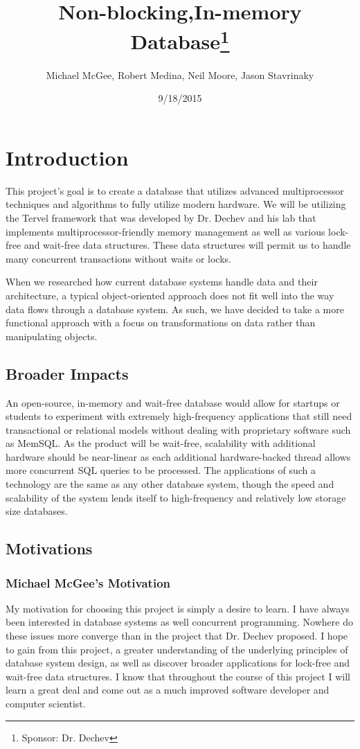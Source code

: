 \documentclass[letterpaper]{article}
\title{Non-blocking,In-memory Database\thanks{Sponsor: Dr. Dechev}}
\author{Michael McGee, Robert Medina, Neil Moore, Jason Stavrinaky}
\date{9/18/2015}
\begin{document}
  \maketitle
  \newpage

  \section{Introduction}
  This project's goal is to create a database that utilizes advanced multiprocessor techniques and algorithms to fully utilize modern hardware.
  We will be utilizing the Tervel framework that was developed by Dr. Dechev and his lab that implements multiprocessor-friendly memory management
  as well as various lock-free and wait-free data structures. These data structures will permit us to handle many concurrent transactions without 
  waits or locks.
  
  When we researched how current database systems handle data and their architecture, a typical object-oriented approach does not fit well into the 
  way data flows through a database system. As such, we have decided to take a more functional approach with a focus on transformations on data rather
  than manipulating objects.
  
  \subsection{Broader Impacts}
  An open-source, in-memory and wait-free database would allow for startups or students to experiment with extremely high-frequency applications that
  still need transactional or relational models without dealing with proprietary software such as MemSQL. As the product will be wait-free, scalability 
  with additional hardware should be near-linear as each additional hardware-backed thread allows more concurrent SQL queries to be processed. The 
  applications of such a technology are the same as any other database system, though the speed and scalability of the system lends itself to high-frequency
  and relatively low storage size databases.
  
  \subsection{Motivations}
  \subsubsection{Michael McGee's Motivation}
  My motivation for choosing this project is simply a desire to learn. I have always been interested in database systems as well concurrent programming. Nowhere do these issues more converge than in the project that Dr. Dechev proposed.  
  I hope to gain from this project, a greater understanding of the underlying principles of database system design, as well as discover broader applications for lock-free and wait-free data structures. I know that throughout the course of this project I will learn a great deal and come out as a much improved software developer and computer scientist.  
\end{document}

